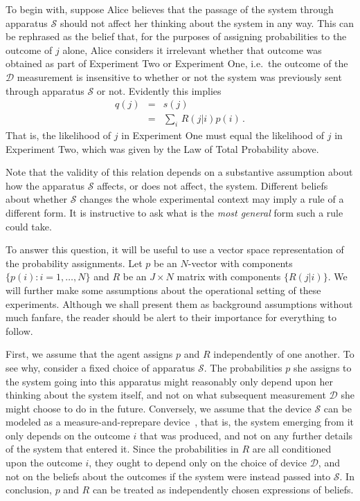 \documentclass[%
 reprint,superscriptaddress,
 amsmath,amssymb,
 aps,pra, onecolumn, 12pt
]{revtex4-2}
\newcommand{\eqn}[1]{\begin{eqnarray} #1 \end{eqnarray}}
\newcommand{\tit}[1]{\textit{#1}}
\newcommand{\zum}[2]{\displaystyle\sum_{#1}^{#2}}
\newcommand{\onestage}{{One}}
\newcommand{\twostage}{{Two}}
\begin{document}
To begin with, suppose Alice believes that the passage of the system through apparatus $\mathcal{S}$ should not affect her thinking about the system in any way. This can be rephrased as the belief that, for the purposes of assigning probabilities to the outcome of $j$ alone, Alice considers it irrelevant whether that outcome was obtained as part of Experiment \twostage{} or Experiment \onestage, i.e.\ the outcome of the $\mathcal{D}$ measurement is insensitive to whether or not the system was previously sent through apparatus $\mathcal{S}$ or not. Evidently this implies
\eqn{
q(j) &=& s(j) \, \nonumber \\
&=& \zum{i}{}\, R(j|i)p(i) \, .
}
That is, the likelihood of $j$ in Experiment \onestage{} must equal the likelihood of $j$ in Experiment \twostage, which was given by the Law of Total Probability above.

Note that the validity of this relation depends on a substantive assumption about how the apparatus $\mathcal{S}$ affects, or does not affect, the system. Different beliefs about whether $\mathcal{S}$ changes the whole experimental context may imply a rule of a different form. It is instructive to ask what is the \tit{most general} form such a rule could take.

To answer this question, it will be useful to use a vector space representation of the probability assignments. Let $p$ be an $N$-vector with components $\{ p(i) : i=1,\dots,N \}$ and $R$ be an $J\times N$ matrix with components $\{ R(j|i) \}$.  We will further make some assumptions about the operational setting of these experiments. Al\-though we shall present them as background assumptions without much fanfare, the reader should be alert to their importance for everything to follow.

First, we assume that the agent assigns $p$ and $R$ independently of one another. To see why, consider a fixed choice of apparatus $\mathcal{S}$. The probabilities $p$ she assigns to the system going into this apparatus might reasonably only depend upon her thinking about the system itself, and not on what subsequent measurement $\mathcal{D}$ she might choose to do in the future. Conversely, we assume that the device $\mathcal{S}$ can be modeled as a measure-and-reprepare device~\cite{DeBrota20b}, that is, the system emerging from it only depends on the outcome $i$ that was produced, and not on any further details of the system that entered it. Since the probabilities in $R$ are all conditioned upon the outcome $i$, they ought to depend only on the choice of device $\mathcal{D}$, and not on the beliefs about the outcomes if the system were instead passed into $\mathcal{S}$. In conclusion, $p$ and $R$ can be treated as independently chosen expressions of beliefs.
\end{document}
